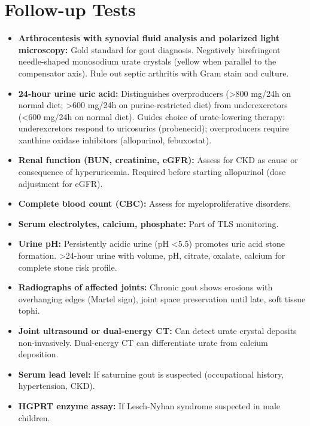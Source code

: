 \section*{Follow-up Tests}
\begin{itemize}
  \item \textbf{Arthrocentesis with synovial fluid analysis and polarized light microscopy:} Gold standard for gout diagnosis. Negatively birefringent needle-shaped monosodium urate crystals (yellow when parallel to the compensator axis). Rule out septic arthritis with Gram stain and culture.
  \item \textbf{24-hour urine uric acid:} Distinguishes overproducers (>800 mg/24h on normal diet; >600 mg/24h on purine-restricted diet) from underexcretors (<600 mg/24h on normal diet). Guides choice of urate-lowering therapy: underexcretors respond to uricosurics (probenecid); overproducers require xanthine oxidase inhibitors (allopurinol, febuxostat).
  \item \textbf{Renal function (BUN, creatinine, eGFR):} Assess for CKD as cause or consequence of hyperuricemia. Required before starting allopurinol (dose adjustment for eGFR).
  \item \textbf{Complete blood count (CBC):} Assess for myeloproliferative disorders.
  \item \textbf{Serum electrolytes, calcium, phosphate:} Part of TLS monitoring.
  \item \textbf{Urine pH:} Persistently acidic urine (pH <5.5) promotes uric acid stone formation. >24-hour urine with volume, pH, citrate, oxalate, calcium for complete stone risk profile.
  \item \textbf{Radiographs of affected joints:} Chronic gout shows erosions with overhanging edges (Martel sign), joint space preservation until late, soft tissue tophi.
  \item \textbf{Joint ultrasound or dual-energy CT:} Can detect urate crystal deposits non-invasively. Dual-energy CT can differentiate urate from calcium deposition.
  \item \textbf{Serum lead level:} If saturnine gout is suspected (occupational history, hypertension, CKD).
  \item \textbf{HGPRT enzyme assay:} If Lesch-Nyhan syndrome suspected in male children.
\end{itemize}

